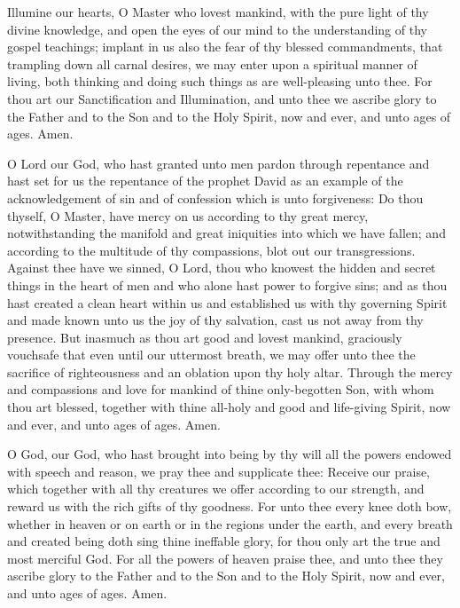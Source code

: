  Illumine our hearts, O Master who lovest mankind, with the pure light of thy divine knowledge, and open the eyes of our mind to the understanding of thy gospel teachings; implant in us also the fear of thy blessed commandments, that trampling down all carnal desires, we may enter upon a spiritual manner of living, both thinking and doing such things as are well-pleasing unto thee. For thou art our Sanctification and Illumination, and unto thee we ascribe glory to the Father and to the Son and to the Holy Spirit, now and ever, and unto ages of ages. Amen.

 O Lord our God, who hast granted unto men pardon through repentance and hast set for us the repentance of the prophet David as an example of the acknowledgement of sin and of confession which is unto forgiveness: Do thou thyself, O Master, have mercy on us according to thy great mercy, notwithstanding the manifold and great iniquities into which we have fallen; and according to the multitude of thy compassions, blot out our transgressions. Against thee have we sinned, O Lord, thou who knowest the hidden and secret things in the heart of men and who alone hast power to forgive sins; and as thou hast created a clean heart within us and established us with thy governing Spirit and made known unto us the joy of thy salvation, cast us not away from thy presence. But inasmuch as thou art good and lovest mankind, graciously vouchsafe that even until our uttermost breath, we may offer unto thee the sacrifice of righteousness and an oblation upon thy holy altar. Through the mercy and compassions and love for mankind of thine only-begotten Son, with whom thou art blessed, together with thine all-holy and good and life-giving Spirit, now and ever, and unto ages of ages. Amen.

 O God, our God, who hast brought into being by thy will all the powers endowed with speech and reason, we pray thee and supplicate thee: Receive our praise, which together with all thy creatures we offer according to our strength, and reward us with the rich gifts of thy goodness. For unto thee every knee doth bow, whether in heaven or on earth or in the regions under the earth, and every breath and created being doth sing thine ineffable glory, for thou only art the true and most merciful God. For all the powers of heaven praise thee, and unto thee they ascribe glory to the Father and to the Son and to the Holy Spirit, now and ever, and unto ages of ages. Amen.

